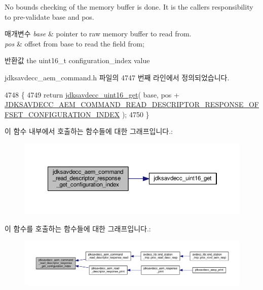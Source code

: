 No bounds checking of the memory buffer is done. It is the caller\textquotesingle{}s responsibility to pre-\/validate base and pos.


\begin{DoxyParams}{매개변수}
{\em base} & pointer to raw memory buffer to read from. \\
\hline
{\em pos} & offset from base to read the field from; \\
\hline
\end{DoxyParams}
\begin{DoxyReturn}{반환값}
the uint16\+\_\+t configuration\+\_\+index value 
\end{DoxyReturn}


jdksavdecc\+\_\+aem\+\_\+command.\+h 파일의 4747 번째 라인에서 정의되었습니다.


\begin{DoxyCode}
4748 \{
4749     \textcolor{keywordflow}{return} \hyperlink{group__endian_ga3fbbbc20be954aa61e039872965b0dc9}{jdksavdecc\_uint16\_get}( base, pos + 
      \hyperlink{group__command__read__descriptor__response_ga8c4fa190d360df1986bef903b1cfbb94}{JDKSAVDECC\_AEM\_COMMAND\_READ\_DESCRIPTOR\_RESPONSE\_OFFSET\_CONFIGURATION\_INDEX}
       );
4750 \}
\end{DoxyCode}


이 함수 내부에서 호출하는 함수들에 대한 그래프입니다.\+:
\nopagebreak
\begin{figure}[H]
\begin{center}
\leavevmode
\includegraphics[width=350pt]{group__command__read__descriptor__response_ga0d1826279430f6203f212b1851732796_cgraph}
\end{center}
\end{figure}




이 함수를 호출하는 함수들에 대한 그래프입니다.\+:
\nopagebreak
\begin{figure}[H]
\begin{center}
\leavevmode
\includegraphics[width=350pt]{group__command__read__descriptor__response_ga0d1826279430f6203f212b1851732796_icgraph}
\end{center}
\end{figure}


